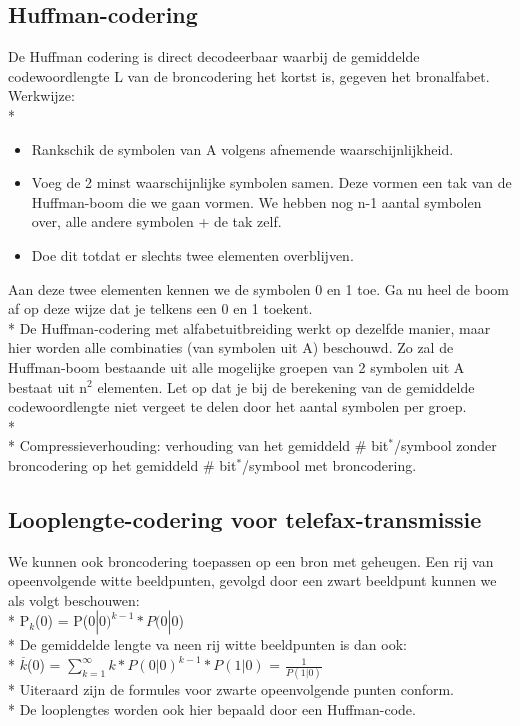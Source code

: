 \documentclass[10pt]{article}
\begin{document}
\subsection{Huffman-codering}
De Huffman codering is direct decodeerbaar waarbij de gemiddelde codewoordlengte L van de broncodering het kortst is, gegeven het bronalfabet. Werkwijze:\\*
\begin{itemize}
\item Rankschik de symbolen van A volgens afnemende waarschijnlijkheid.
\item Voeg de 2 minst waarschijnlijke symbolen samen. Deze vormen een tak van de Huffman-boom die we gaan vormen. We hebben nog n-1 aantal symbolen over, alle andere symbolen + de tak zelf.
\item Doe dit totdat er slechts twee elementen overblijven.
\end{itemize}
Aan deze twee elementen kennen we de symbolen 0 en 1 toe. Ga nu heel de boom af op deze wijze dat je telkens een 0 en 1 toekent.\\*
De Huffman-codering met alfabetuitbreiding werkt op dezelfde manier, maar hier worden alle combinaties (van symbolen uit A) beschouwd. Zo zal de Huffman-boom bestaande uit alle mogelijke groepen van 2 symbolen uit A bestaat uit n$^2$ elementen. Let op dat je bij de berekening van de gemiddelde codewoordlengte niet vergeet te delen door het aantal symbolen per groep.\\*\\*
Compressieverhouding: verhouding van het gemiddeld $\#$ bit$^*$/symbool zonder broncodering op het gemiddeld $\#$ bit$^*$/symbool met broncodering.
\subsection{Looplengte-codering voor telefax-transmissie}
We kunnen ook broncodering toepassen op een bron met geheugen. Een rij van opeenvolgende witte beeldpunten, gevolgd door een zwart beeldpunt kunnen we als volgt beschouwen:\\*
P$_k$(0) = P(0$|0)^{k-1}*P(0|$0)\\*
De gemiddelde lengte va neen rij witte beeldpunten is dan ook:\\*
$\overline{k}$(0) = $\sum_{k=1}^{\infty} k*P(0|0)^{k-1}*P(1|0)$ = $\frac{1}{P(1|0)}$\\*
{\scriptsize Uiteraard zijn de formules voor zwarte opeenvolgende punten conform.}\\*
De looplengtes worden ook hier bepaald door een Huffman-code.
\end{document}
